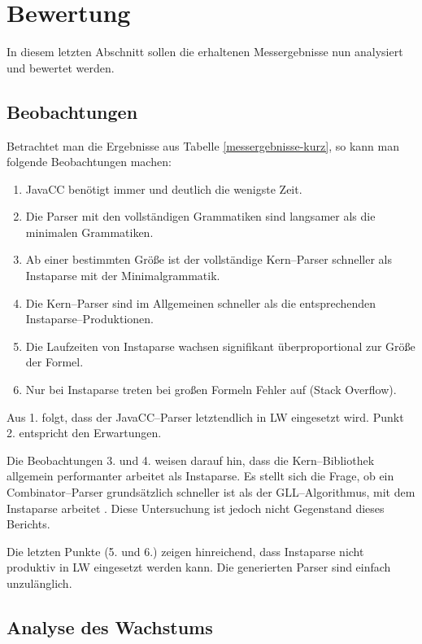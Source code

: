 \documentclass[ngerman,a4paper,abstracton,open=right,twoside=false,toc=listofnumbered,bibtotocnumbered]{scrreprt}
\begin{document}
\chapter{Bewertung}

In diesem letzten Abschnitt sollen die erhaltenen Messergebnisse nun analysiert und bewertet werden.

\section{Beobachtungen}

Betrachtet man die Ergebnisse aus Tabelle \ref{messergebnisse-kurz}, so kann man folgende Beobachtungen machen:

\begin{enumerate}
	\item JavaCC benötigt immer und deutlich die wenigste Zeit.
	\item Die Parser mit den vollständigen Grammatiken sind langsamer als die minimalen Grammatiken.
	\item Ab einer bestimmten Größe ist der vollständige Kern--Parser schneller als Instaparse mit der Minimalgrammatik.
	\item Die Kern--Parser sind im Allgemeinen schneller als die entsprechenden Instaparse--Produktionen.
	\item Die Laufzeiten von Instaparse wachsen signifikant überproportional zur Größe der Formel.
	\item Nur bei Instaparse treten bei großen Formeln Fehler auf (Stack Overflow).
\end{enumerate}

Aus 1. folgt, dass der JavaCC--Parser letztendlich in LW eingesetzt wird. Punkt 2. entspricht den Erwartungen.

Die Beobachtungen 3. und 4. weisen darauf hin, dass die Kern--Bibliothek allgemein performanter arbeitet als Instaparse. Es stellt sich die Frage, ob ein Combinator--Parser grundsätzlich schneller ist als der GLL--Algorithmus, mit dem Instaparse arbeitet \cite[Special Thanks]{instaparse}. Diese Untersuchung ist jedoch nicht Gegenstand dieses Berichts.

Die letzten Punkte (5. und 6.) zeigen hinreichend, dass Instaparse nicht produktiv in LW eingesetzt werden kann. Die generierten Parser sind einfach unzulänglich.

\section{Analyse des Wachstums}
\end{document}
